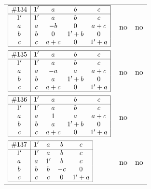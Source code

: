 \documentclass[12pt]{article}
\newcommand{\join}{\mathbin{+}}%
\newcommand{\id}{{1'}}%
\renewcommand{\top}{1}%
\begin{document}
\begin{center}
\begin{longtable}{l|c|c}
$
\begin{array}{|c|cccc|} \hline
\#134 & \id & a & b & c \\ \hline
\id & \id & a & b & c \\
a & a & -b & 0 & a \join c \\
b & b & 0 & \id \join b & 0 \\
c & c & a \join c & 0 & \id \join a \\ \hline
\end{array}
$
 & no  
 & no      \\[15mm]

$
\begin{array}{|c|cccc|} \hline
\#135 & \id & a & b & c \\ \hline
\id & \id & a & b & c \\
a & a & -a & a & a \join c \\
b & b & a & \id \join b & 0 \\
c & c & a \join c & 0 & \id \join a \\ \hline
\end{array}
$
 & no  
 & no      \\[15mm]

$
\begin{array}{|c|cccc|} \hline
\#136 & \id & a & b & c \\ \hline
\id & \id & a & b & c \\
a & a & \top & a & a \join c \\
b & b & a & \id \join b & 0 \\
c & c & a \join c & 0 & \id \join a \\ \hline
\end{array}
$
 & no  
 & \adjustbox{valign=c, max height=1.6cm}{$
\left[ \begin{array}{cccccc}
\id & a & b & a & a & b \\ 
a & \id & a & c & a & a \\ 
b & a & \id & a & a & b \\ 
a & c & a & \id & c & a \\ 
a & a & a & c & \id & a \\ 
b & a & b & a & a & \id
\end{array}\right]
$}      \\[15mm]

$
\begin{array}{|c|cccc|} \hline
\#137 & \id & a & b & c \\ \hline
\id & \id & a & b & c \\
a & a & \id & b & c \\
b & b & b & -c & 0 \\
c & c & c & 0 & \id \join a \\ \hline
\end{array}
$
 & no  
 & no      \\[15mm]


\end{longtable}
\end{center}
\end{document}

